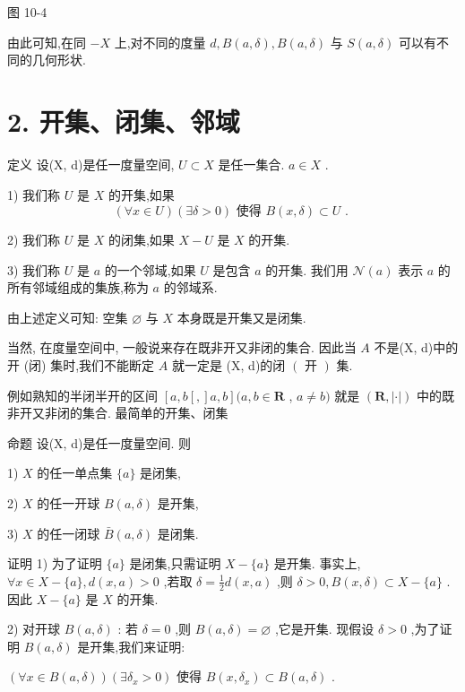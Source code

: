 图 10-4

由此可知,在同 $- X$ 上,对不同的度量 $d,B\left( {a,\delta }\right) ,B\left( {a,\delta }\right)$ 与 $S\left( {a,\delta }\right)$ 可以有不同的几何形状.

\section*{2. 开集、闭集、邻域}

定义 设(X, d)是任一度量空间, $U \subset  X$ 是任一集合. $a \in  X$ .

1) 我们称 $U$ 是 $X$ 的开集,如果
$$\left( {\forall x \in  U}\right) \left( {\exists \delta  > 0}\right) \text{ 使得 }B\left( {x,\delta }\right)  \subset  U\text{ . }$$

2) 我们称 $U$ 是 $X$ 的闭集,如果 $X - U$ 是 $X$ 的开集.

3) 我们称 $U$ 是 $a$ 的一个邻域,如果 $U$ 是包含 $a$ 的开集. 我们用 $\mathcal{N}\left( a\right)$ 表示 $a$ 的所有邻域组成的集族,称为 $a$ 的邻域系.

由上述定义可知: 空集 $\varnothing$ 与 $X$ 本身既是开集又是闭集.

当然, 在度量空间中, 一般说来存在既非开又非闭的集合. 因此当 $A$ 不是(X, d)中的开 (闭) 集时,我们不能断定 $A$ 就一定是 (X, d)的闭 $\left( \text{ 开 }\right)$ 集.

例如熟知的半闭半开的区间 $\left\lbrack  {a,b\left\lbrack  ,\right\rbrack  a,b}\right\rbrack  (a,b \in  \mathbf{R}$ , $a \neq  b)$ 就是 $\left( {\mathbf{R},\left| \cdot \right| }\right)$ 中的既非开又非闭的集合. 最简单的开集、闭集

命题 设(X, d)是任一度量空间. 则

1) $X$ 的任一单点集 $\{ a\}$ 是闭集,

2) $X$ 的任一开球 $B\left( {a,\delta }\right)$ 是开集,

3) $X$ 的任一闭球 $\bar{B}\left( {a,\delta }\right)$ 是闭集.

证明 1) 为了证明 $\{ a\}$ 是闭集,只需证明 $X - \{ a\}$ 是开集. 事实上, $\forall x \in  X - \{ a\} ,d\left( {x,a}\right)  > 0$ ,若取 $\delta  = \frac{1}{2}d\left( {x,a}\right)$ ,则 $\delta  > 0,B\left( {x,\delta }\right)  \subset  X - \{ a\}$ . 因此 $X - \{ a\}$ 是 $X$ 的开集.

2) 对开球 $B\left( {a,\delta }\right)$ : 若 $\delta  = 0$ ,则 $B\left( {a,\delta }\right)  = \varnothing$ ,它是开集. 现假设 $\delta  > 0$ ,为了证明 $B\left( {a,\delta }\right)$ 是开集,我们来证明:

$\left( {\forall x \in  B\left( {a,\delta }\right) }\right) \left( {\exists {\delta }_{x} > 0}\right)$ 使得 $B\left( {x,{\delta }_{x}}\right)  \subset  B\left( {a,\delta }\right)$ .

